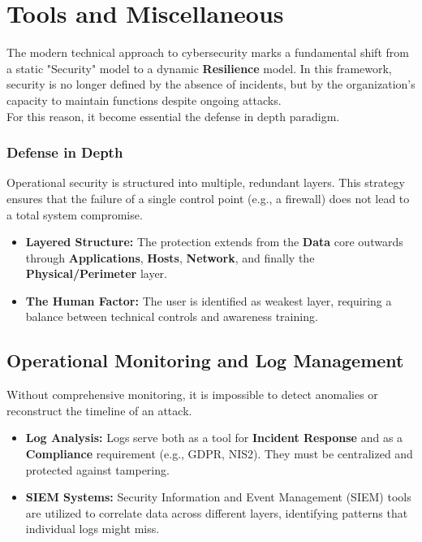 \section{Tools and Miscellaneous}

The modern technical approach to cybersecurity marks a fundamental shift from a static "Security" model to a dynamic \textbf{Resilience} model. In this framework, security is no longer defined by the absence of incidents, but by the organization's capacity to maintain functions despite ongoing attacks.\\
For this reason, it become essential the defense in depth paradigm.

\subsubsection*{Defense in Depth}
Operational security is structured into multiple, redundant layers. This strategy ensures that the failure of a single control point (e.g., a firewall) does not lead to a total system compromise.
\begin{itemize}
    \item \textbf{Layered Structure:} The protection extends from the \textbf{Data} core outwards through \textbf{Applications}, \textbf{Hosts}, \textbf{Network}, and finally the \textbf{Physical/Perimeter} layer.
    \item \textbf{The Human Factor:} The user is identified as weakest layer, requiring a balance between technical controls and awareness training.
\end{itemize}

\subsection{Operational Monitoring and Log Management}
Without comprehensive monitoring, it is impossible to detect anomalies or reconstruct the timeline of an attack.
\begin{itemize}
    \item \textbf{Log Analysis:} Logs serve both as a tool for \textbf{Incident Response} and as a \textbf{Compliance} requirement (e.g., GDPR, NIS2). They must be centralized and protected against tampering.
    \item \textbf{SIEM Systems:} Security Information and Event Management (SIEM) tools are utilized to correlate data across different layers, identifying patterns that individual logs might miss.
\end{itemize}

